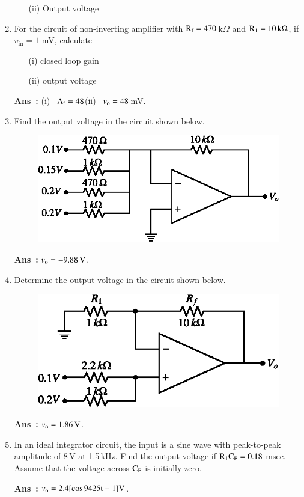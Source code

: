 \begin{enumerate}
\begin{itemize}
\item[(ii)] Output voltage
\end{itemize}

\item For the circuit of non-inverting amplifier with $\textrm{R}_{\textrm{f}}=470$\,k$\Omega$ and $\textrm{R}_{1}=10\,\textrm{k}\Omega$, if $v_{\text{in}}=1$ mV, calculate
\begin{itemize}
\item[(i)] closed loop gain

\item[(ii)] output voltage
\end{itemize}

\smallskip
\noindent
{\bf Ans~:} (i)~ $\textrm{A}_{\textrm{f}}=48$\quad (ii)~ $v_{\textrm{o}}=48$\,mV.

\eject

\item Find the output voltage in the circuit shown below.
\begin{figure}[H]
\centering
\includegraphics{chap4/exr4.8.eps}
\end{figure}

\smallskip
\noindent
{\bf Ans~:} $v_{\textrm{o}}=-9.88\,\textrm{V}$.

\item Determine the output voltage in the circuit shown below.
\begin{figure}[H]
\centering
\includegraphics{chap4/exr4.9.eps}
\end{figure}

\smallskip
\noindent
{\bf Ans~:} $v_{\textrm{o}}=1.86\,\textrm{V}$.

\item In an ideal integrator circuit, the input is a sine wave with peak-to-peak amplitude of 8\,V at 1.5\,kHz. Find the output voltage if $\textrm{R}_{1}\textrm{C}_{\textrm{F}}=0.18$ msec. Assume that the voltage across $\textrm{C}_{\textrm{F}}$ is initially zero.

\smallskip
\noindent
{\bf Ans~:} $v_{\textrm{o}}=2.4[\cos 9425\textrm{t}-1]\textrm{V}$.
\end{enumerate}


\label{4end}
